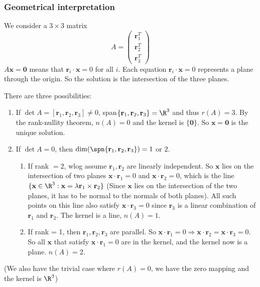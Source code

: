\documentclass[a4paper]{article}
\begin{document}
\subsubsection{Geometrical interpretation}
We consider a $3\times 3$ matrix
\[
  A = \begin{pmatrix} \mathbf{r}_1^T\\\mathbf{r}_2^T\\\mathbf{r}_3^T\end{pmatrix}
\]
$A\mathbf{x} = \mathbf{0}$ means that $\mathbf{r}_i\cdot \mathbf{x} = 0$ for all $i$. Each equation $\mathbf{r}_i\cdot \mathbf{x} = 0$ represents a plane through the origin. So the solution is the intersection of the three planes.

There are three possibilities:
\begin{enumerate}
  \item If $\det A =[\mathbf{r}_1, \mathbf{r}_2, \mathbf{r}_3] \not= 0$, span$\{\mathbf{r}_1, \mathbf{r}_2, \mathbf{r}_3\} = \R^3$ and thus $r(A) = 3$. By the rank-nullity theorem, $n(A) = 0$ and the kernel is $\{\mathbf{0}\}$. So $\mathbf{x} = \mathbf{0}$ is the unique solution.
  \item If $\det A = 0$, then $\dim(\spn\{\mathbf{r}_1, \mathbf{r}_2, \mathbf{r}_3\}) = 1$ or $2$.
    \begin{enumerate}
      \item If rank $= 2$, wlog assume $\mathbf{r}_1, \mathbf{r}_2$ are linearly independent. So $\mathbf{x}$ lies on the intersection of two planes $\mathbf{x}\cdot \mathbf{r}_1 = 0$ and $\mathbf{x}\cdot \mathbf{r}_2 = 0$, which is the line $\{\mathbf{x}\in \R^3: \mathbf{x} = \lambda \mathbf{r}_1\times \mathbf{r}_2\}$ (Since $\mathbf{x}$ lies on the intersection of the two planes, it has to be normal to the normals of both planes). All such points on this line also satisfy $\mathbf{x}\cdot\mathbf{r}_3 = 0$ since $\mathbf{r}_3$ is a linear combination of $\mathbf{r}_1$ and $\mathbf{r}_2$. The kernel is a line, $n(A) = 1$.
      \item If rank = 1, then $\mathbf{r}_1, \mathbf{r}_2, \mathbf{r}_3$ are parallel. So $\mathbf{x}\cdot \mathbf{r}_1 = 0 \Rightarrow \mathbf{x}\cdot \mathbf{r}_2 = \mathbf{x}\cdot \mathbf{r}_3 = 0$. So all $\mathbf{x}$ that satisfy $\mathbf{x}\cdot \mathbf{r}_1 = 0$ are in the kernel, and the kernel now is a plane. $n(A) = 2$.
    \end{enumerate}
\end{enumerate}
(We also have the trivial case where $r(A) = 0$, we have the zero mapping and the kernel is $\R^3$)
\end{document}
